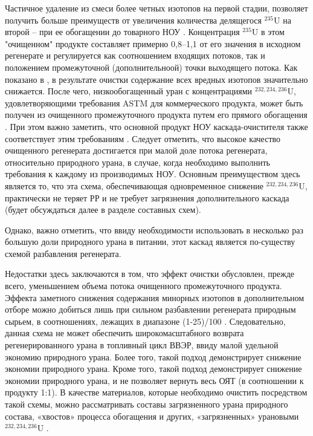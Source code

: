 Частичное удаление из смеси более четных изотопов на первой стадии, позволяет получить больше преимуществ от увеличения количества делящегося $^{235}$U на второй -- при ее обогащении до товарного НОУ \cite{palkinSeparationUraniumIsotopes2010}.
Концентрация $^{235}$U в этом "очищенном" продукте составляет примерно 0,8--1,1 от его значения в исходном регенерате и регулируется как соотношением входящих потоков, так и положением промежуточной (дополнительноой) точки выходящего потока.
Как показано в \cite{palkinSeparationUraniumIsotopes2010}, в результате очистки содержание всех вредных изотопов значительно снижается. После чего, низкообогащенный уран с концентрациями $^{232,234,236}$U, удовлетворяющими требования ASTM для коммерческого продукта, может быть получен из очищенного промежуточного продукта путем его прямого обогащения \cite{shopenSposobPolucheniyaRazbavitelya2008}.
При этом важно заметить, что основной продукт НОУ каскада-очистителя также соответствует этим требованиям \cite{palkinSeparationUraniumIsotopes2010}. Следует отметить, что высокое качество очищенного регенерата достигается при малой доле потока регенерата, относительно природного урана, в случае, когда необходимо выполнить требования к каждому из производимых НОУ.
Основным преимуществом здесь является то, что эта схема, обеспечивающая одновременное снижение $^{232,234,236}$U, практически не теряет РР и не требует загрязнения дополнительного каскада (будет обсуждаться далее в разделе составных схем).

Однако, важно отметить, что ввиду необходимости использовать в несколько раз большую доли природного урана в питании, этот каскад является по-существу схемой разбавления регенерата. 

Недостатки здесь заключаются в том, что эффект очистки обусловлен, прежде всего, уменьшением объема потока очищенного промежуточного продукта. Эффекта заметного снижения содержания минорных изотопов в дополнительном отборе можно добиться лишь при сильном разбавлении регенерата природным сырьем, в соотношениях, лежащих в диапазоне (1-25)/100 \cite{palkinSeparationUraniumIsotopes2010, smirnovKaskadnyeShemyZadachah2012}. Следовательно, данная схема не может обеспечить широкомасштабного возврата регенерированного урана в топливный цикл ВВЭР, ввиду малой удельной экономию природного урана.  Более того, такой подход демонстрирует снижение экономии природного урана. Кроме того, такой подход демонстрирует снижение экономии природного урана, и не позволяет вернуть весь ОЯТ (в соотношении к продукту 1:1).
В качестве материалов, которые необходимо очистить посредством такой схемы, можно рассматривать составы загрязненного урана природного состава, «хвостов» процесса обогащения и других, «загрязненных» урановыми $^{232,234,236}$U \cite{palkinSeparationUraniumIsotopes2010}. 




